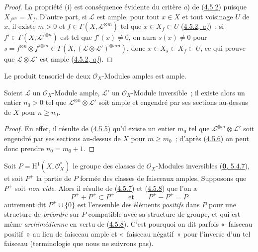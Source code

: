 \begin{proof}
La propriété (i) est conséquence évidente du critère \emph{a}) de
(\hyperref[II.4.5.2-fr]{4.5.2}) puisque $X_{f^{\otimes n}}=X_f$. D'autre
part, si $\mathcal{L}$ est ample, pour tout $x\in X$ et tout voisinage $U$ de
$x$, il existe $m>0$ et $f\in\Gamma(X,\mathcal{L}^{\otimes m})$ tel que
$x\in X_f\subset U$ (\hyperref[II.4.5.2-fr]{4.5.2, \emph{a)}})~; si
$f'\in\Gamma(X,\mathcal{L}'^{\otimes n})$ est tel que $f'(x)\neq0$, on aura
$s(x)\neq0$ pour
$s=f^{\otimes n}\otimes f'^{\otimes m}\in
\Gamma(X,(\mathcal{L}\otimes\mathcal{L}')^{\otimes mn})$, donc
$x\in X_s\subset X_f\subset U$, ce qui prouve que
$\mathcal{L}\otimes\mathcal{L}'$ est ample
(\hyperref[II.4.5.2-fr]{4.5.2, \emph{a)}}).
\end{proof}

\begin{corollary}[4.5.7]
\label{II.4.5.7-fr}
Le produit tensoriel de deux $\mathcal{O}_X$-Modules amples est ample.
\end{corollary}

\begin{corollary}[4.5.8]
\label{II.4.5.8-fr}
Soient $\mathcal{L}$ un $\mathcal{O}_X$-Module ample, $\mathcal{L}'$ un
$\mathcal{O}_X$-Module inversible~; il existe alors un entier $n_0>0$ tel
que $\mathcal{L}^{\otimes n}\otimes\mathcal{L}'$ soit ample et engendré par
ses sections au-dessus de $X$ pour $n\geq n_0$.
\end{corollary}

\begin{proof}
En effet, il résulte de (\hyperref[II.4.5.5-fr]{4.5.5}) qu'il existe un entier
$m_0$ tel que $\mathcal{L}^{\otimes m}\otimes\mathcal{L}'$ soit engendré par
ses sections au-dessus de $X$ pour $m\geq m_0$~; d'après
(\hyperref[II.4.5.6-fr]{4.5.6}) on peut donc prendre $n_0=m_0+1$.
\end{proof}

\begin{remark}[4.5.9]
\label{II.4.5.9-fr}
Soit $P=\mathrm{H}^1(X,\mathcal{O}_X^*)$ le groupe des classes de
$\mathcal{O}_X$-Modules inversibles (\hyperref[0.5.4.7-fr]{\textbf{0}, 5.4.7}), et
soit $P^+$ la partie de $P$ formée des classes de faisceaux amples. Supposons
que $P^+$ soit \emph{non vide}. Alors il résulte de
(\hyperref[II.4.5.7-fr]{4.5.7}) et
(\hyperref[II.4.5.8-fr]{4.5.8}) que l'on a
\[
  P^++P^+\subset P^+
  \qquad\text{et}\qquad
  P^+-P^+=P
\]
autrement dit $P^+\cup\{0\}$ est l'ensemble des éléments \emph{positifs} dans $P$
pour une structure de \emph{préordre} sur $P$ compatible avec sa structure de
groupe, et qui est même \emph{archimédienne} en vertu de
(\hyperref[II.4.5.8-fr]{4.5.8}). C'est pourquoi on dit parfois «~faisceau
positif~» au lieu de faisceau ample et «~faisceau négatif~» pour l'inverse
d'un tel faisceau (terminologie que nous ne suivrons pas).
\end{remark}

